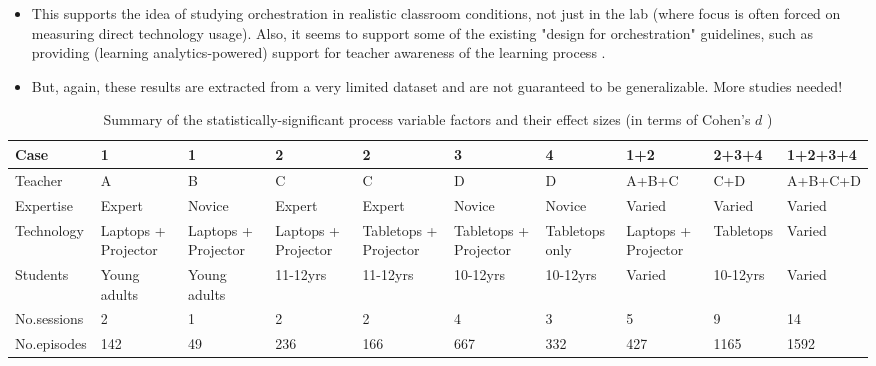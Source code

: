 \documentclass[10pt,journal,compsoc]{IEEEtran}
\begin{document}
\begin{itemize}
\item This supports the idea of studying orchestration in realistic classroom conditions, not just in the lab (where focus is often forced on measuring direct technology usage). Also, it seems to support some of the existing "design for orchestration" guidelines, such as providing (learning analytics-powered) support for teacher awareness of the learning process \cite{dillenbourg2013design}.
\item But, again, these results are extracted from a very limited dataset and are not guaranteed to be generalizable. More studies needed!
\end{itemize}

\begin{table}[!t]
\caption{Summary of the statistically-significant process variable factors and their effect sizes (in terms of Cohen's $d$ \cite{cohen1977statistical})}
\label{tab:trends}
\centering
\begin{tabular}{|p{3cm}||p{1.2cm}|p{1.2cm}|p{1.2cm}|p{1.2cm}|p{1.2cm}|p{1.2cm}|p{1.2cm}|p{1.2cm}|p{1.2cm}|}
  \hline
Case & 1       & 1       & 2       & 2       & 3       & 4       & 1+2     & 2+3+4   & 1+2+3+4 \\ 
  \hline
  Teacher & A       & B       & C       & C       & D       & D       & A+B+C   & C+D     & A+B+C+D \\ 
  \hline
  Expertise & Expert & Novice & Expert & Expert & Novice & Novice & Varied & Varied & Varied \\ 
  \hline
  Technology & Laptops + Projector   & Laptops + Projector   & Laptops + Projector   & Tabletops + Projector & Tabletops + Projector & Tabletops only      & Laptops + Projector   & Tabletops           & Varied              \\ 
  \hline
  Students & Young adults & Young adults & 11-12yrs     & 11-12yrs     & 10-12yrs     & 10-12yrs     & Varied       & 10-12yrs     & Varied       \\ 
  \hline
  No.sessions &  2 &  1 &  2 &  2 &  4 &  3 &  5 &  9 & 14 \\ 
  \hline
  No.episodes &  142 &   49 &  236 &  166 &  667 &  332 &  427 & 1165 & 1592 \\ 

\end{tabular}
\end{table}
\end{document}
